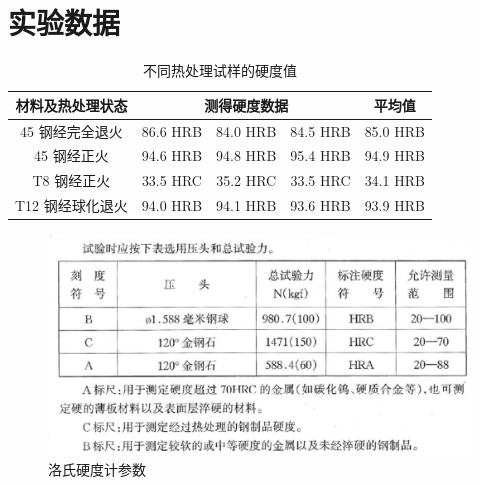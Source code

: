 \section{实验数据}
\begin{table}[!ht]\centering
    \caption{不同热处理试样的硬度值}
    \begin{tabular}{|*{5}{c|}}\hline
        材料及热处理状态 & \multicolumn{3}{c|}{测得硬度数据} & 平均值 \bigstrut \\ \hline
        45 钢经完全退火 & 86.6 HRB & 84.0 HRB & 84.5 HRB & 85.0 HRB \bigstrut \\ \hline
        45 钢经正火 & 94.6 HRB & 94.8 HRB & 95.4 HRB & 94.9 HRB \bigstrut \\ \hline
        T8 钢经正火 & 33.5 HRC & 35.2 HRC & 33.5 HRC & 34.1 HRB \bigstrut \\ \hline
        T12 钢经球化退火 & 94.0 HRB & 94.1 HRB & 93.6 HRB & 93.9 HRB \bigstrut \\ \hline
    \end{tabular}
\end{table}
\begin{figure}[!ht]
    \caption{洛氏硬度计参数}
    \includegraphics[width=\textwidth]{img/A3/fig3.jpg}
\end{figure}\clearpage
